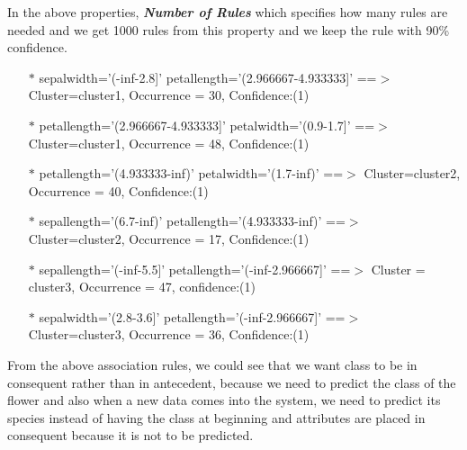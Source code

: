 \documentclass[a4paper,10pt]{article}
\begin{document}
In the above properties, \textbf{\textit{Number of Rules}} which specifies how many rules are needed and we get
1000 rules from this property and we keep the rule with 90\% confidence.
\begin{enumerate}     
  \item [$*$] sepalwidth='(-inf-2.8]' petallength='(2.966667-4.933333]' ==$>$ Cluster=cluster1, Occurrence = 30, Confidence:(1)
  \item [$*$] petallength='(2.966667-4.933333]' petalwidth='(0.9-1.7]' ==$>$ Cluster=cluster1, Occurrence = 48, Confidence:(1)
  \item [$*$] petallength='(4.933333-inf)' petalwidth='(1.7-inf)' ==$>$ Cluster=cluster2, Occurrence = 40, Confidence:(1)
  \item [$*$] sepallength='(6.7-inf)' petallength='(4.933333-inf)' ==$>$ Cluster=cluster2, Occurrence = 17, Confidence:(1)
  \item [$*$] sepallength='(-inf-5.5]' petallength='(-inf-2.966667]' ==$>$ Cluster = cluster3, Occurrence = 47, confidence:(1)
  \item [$*$] sepalwidth='(2.8-3.6]' petallength='(-inf-2.966667]' ==$>$ Cluster=cluster3, Occurrence = 36, Confidence:(1)
\end{enumerate}
\par
From the above association rules, we could see that we want class to be in consequent rather than in antecedent, because
we need to predict the class of the flower and also when a new data comes into the system, we need to predict its species
instead of having the class at beginning and attributes are placed in consequent because it is not to be predicted. \par
\end{document}
